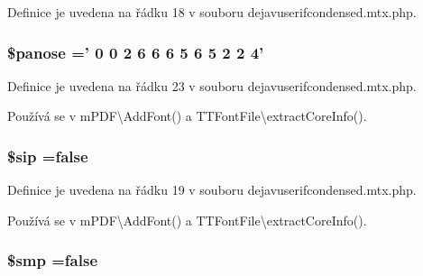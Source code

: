 Definice je uvedena na řádku 18 v souboru dejavuserifcondensed.\-mtx.\-php.

\hypertarget{dejavuserifcondensed_8mtx_8php_adec3b939f59252683592e3ad31a0cd72}{
\subsubsection[{\$panose}]{\setlength{\rightskip}{0pt plus 5cm}\$panose =' 0 0 2 6 6 6 5 6 5 2 2 4'}}\label{dejavuserifcondensed_8mtx_8php_adec3b939f59252683592e3ad31a0cd72}


Definice je uvedena na řádku 23 v souboru dejavuserifcondensed.\-mtx.\-php.



Používá se v m\-P\-D\-F\textbackslash{}\-Add\-Font() a T\-T\-Font\-File\textbackslash{}extract\-Core\-Info().

\hypertarget{dejavuserifcondensed_8mtx_8php_ac07984f1157f4b24cd953085cfc7d40c}{
\subsubsection[{\$sip}]{\setlength{\rightskip}{0pt plus 5cm}\$sip ={\bf false}}}\label{dejavuserifcondensed_8mtx_8php_ac07984f1157f4b24cd953085cfc7d40c}


Definice je uvedena na řádku 19 v souboru dejavuserifcondensed.\-mtx.\-php.



Používá se v m\-P\-D\-F\textbackslash{}\-Add\-Font() a T\-T\-Font\-File\textbackslash{}extract\-Core\-Info().

\hypertarget{dejavuserifcondensed_8mtx_8php_a7c2b1e4834c6dab47a78d2564d23935c}{
\subsubsection[{\$smp}]{\setlength{\rightskip}{0pt plus 5cm}\$smp ={\bf false}}}\label{dejavuserifcondensed_8mtx_8php_a7c2b1e4834c6dab47a78d2564d23935c}


